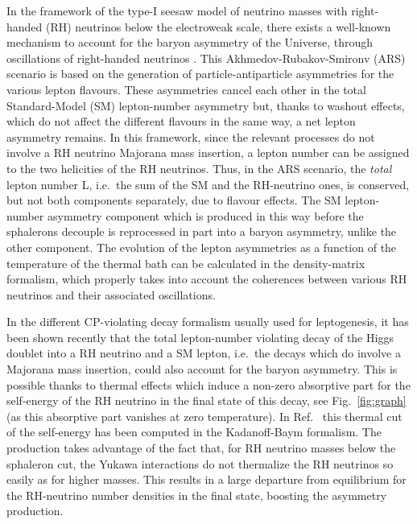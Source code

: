 \documentclass[prd,twocolumn,superscriptaddress,preprintnumbers,nofootinbib,
noshowpacs,groupedaddress]{revtex4-1} %
\begin{document}
In the framework of the type-I seesaw model of neutrino masses with right-handed (RH) neutrinos  below the electroweak scale, there exists a well-known mechanism to account for the baryon asymmetry of the Universe, through oscillations of right-handed neutrinos \cite{Akhmedov:1998qx, Asaka:2005pn, Shaposhnikov:2008pf,Canetti:2010aw,Asaka:2011wq, Drewes:2012ma, Canetti:2012kh,Shuve:2014zua, 
Canetti:2014dka,Abada:2015rta,Hernandez:2015wna, Drewes:2016gmt, Hernandez:2016kel}.
This Akhmedov-Rubakov-Smironv (ARS) scenario is based on the generation of particle-antiparticle asymmetries for the various lepton flavours. These asymmetries cancel each other in the total Standard-Model (SM) lepton-number asymmetry but, thanks to washout effects, which do not affect the different flavours in the same way, a net lepton asymmetry remains. In this framework, since the relevant processes do not involve a RH neutrino Majorana mass insertion, a lepton number can be assigned to the two helicities of the RH neutrinos. Thus, in the ARS scenario, the \emph{total} lepton number L, i.e.~the sum of the SM and the RH-neutrino ones, is conserved, but not both components separately, due to flavour effects. The SM lepton-number asymmetry component which is produced in this way before the sphalerons decouple is reprocessed in part into a baryon asymmetry, unlike the other component. The evolution of the lepton asymmetries as a function of the temperature of the thermal bath can be calculated in the density-matrix formalism, which properly takes into account the coherences between various RH neutrinos and their associated oscillations. 



In the different CP-violating decay formalism usually used for leptogenesis, it has been shown recently \cite{Hambye:2016sby} that the total lepton-number violating decay of the Higgs doublet into a RH neutrino and a SM lepton, i.e.~the decays which do involve a Majorana mass insertion, could also account for the baryon asymmetry. This is possible thanks to thermal effects which induce a non-zero absorptive part for the self-energy of the RH neutrino in the final state of this decay, see Fig.~\ref{fig:graph} (as this absorptive part vanishes at zero temperature). In Ref.~\cite{Hambye:2016sby} this thermal cut of the self-energy has been computed in the Kadanoff-Baym formalism. The production takes advantage of the fact that, for RH neutrino masses below the sphaleron cut, the Yukawa interactions do not thermalize the RH neutrinos so easily as for higher masses. This results in a large departure from equilibrium for the RH-neutrino number densities in the final state,  boosting the asymmetry production.
\end{document}
